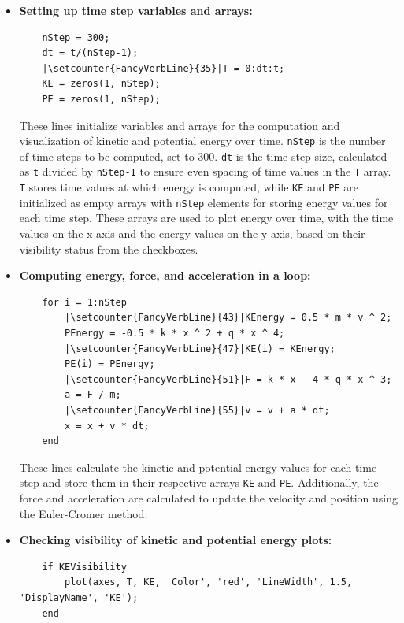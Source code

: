 \documentclass[13pt,a4paper]{report}
\begin{document}
\begin{itemize}[leftmargin=0.1cm]
\item \textbf{Setting up time step variables and arrays:}

\begin{verbatim}
    nStep = 300;
    dt = t/(nStep-1);
    |\setcounter{FancyVerbLine}{35}|T = 0:dt:t;
    KE = zeros(1, nStep);
    PE = zeros(1, nStep);
\end{verbatim}

These lines initialize variables and arrays for the computation and visualization of kinetic and potential energy over time. \texttt{nStep} is the number of time steps to be computed, set to 300. \texttt{dt} is the time step size, calculated as \texttt{t} divided by \texttt{nStep-1} to ensure even spacing of time values in the \texttt{T} array. \texttt{T} stores time values at which energy is computed, while \texttt{KE} and \texttt{PE} are initialized as empty arrays with \texttt{nStep} elements for storing energy values for each time step. These arrays are used to plot energy over time, with the time values on the x-axis and the energy values on the y-axis, based on their visibility status from the checkboxes.

\newpage
\item \textbf{Computing energy, force, and acceleration in a loop:}

\begin{verbatim}
    for i = 1:nStep
        |\setcounter{FancyVerbLine}{43}|KEnergy = 0.5 * m * v ^ 2;
        PEnergy = -0.5 * k * x ^ 2 + q * x ^ 4;
        |\setcounter{FancyVerbLine}{47}|KE(i) = KEnergy;
        PE(i) = PEnergy;
        |\setcounter{FancyVerbLine}{51}|F = k * x - 4 * q * x ^ 3;
        a = F / m;
        |\setcounter{FancyVerbLine}{55}|v = v + a * dt;
        x = x + v * dt;
    end
\end{verbatim}

These lines calculate the kinetic and potential energy values for each time step and store them in their respective arrays \texttt{KE} and \texttt{PE}. Additionally, the force and acceleration are calculated to update the velocity and position using the Euler-Cromer method.

\item \textbf{Checking visibility of kinetic and potential energy plots:}

\begin{verbatim}
    if KEVisibility
        plot(axes, T, KE, 'Color', 'red', 'LineWidth', 1.5, 'DisplayName', 'KE');
    end
    

\end{verbatim}
\end{itemize}
\end{document}
